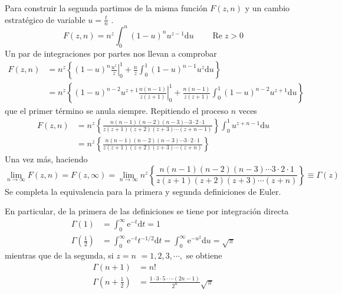 \documentclass[spanish,notitlepage,letterpaper,12pt]{article}
\begin{document}
Para construir la segunda partimos de la misma funci\'{o}n $F(z,n)$ y un
cambio estrat\'{e}gico de variable $u=\frac tn$ .
\[
F(z,n)=n^{z}\int_{0}^{n}\left(  1-u\right)  ^{n}u^{z-1}\mathrm{d}%
u\qquad\operatorname{Re}z>0
\]
Un par de integraciones por partes nos llevan a comprobar
\begin{align*}
F(z,n)  & =n^{z}\left\{  \left.  \left(  1-u\right)  ^{n}\frac{u^{z}}z\right|
_{0}^{1}+\frac nz\int_{0}^{1}\left(  1-u\right)  ^{n-1}u^{z}\mathrm{d}%
u\right\} \\
& =n^{z}\left\{  \left.  \left(  1-u\right)  ^{n-2}u^{z+1}\frac{n(n-1)}%
{z(z+1)}\right|  _{0}^{1}+\frac{n(n-1)}{z(z+1)}\int_{0}^{1}\left(  1-u\right)
^{n-2}u^{z+1}\mathrm{d}u\right\}
\end{align*}
que el primer t\'{e}rmino se anula siempre. Repitiendo el proceso $n$ veces
\begin{align*}
F(z,n)  & =n^{z}\left\{  \frac{n(n-1)(n-2)(n-3)\cdots3\cdot2\cdot
1}{z(z+1)(z+2)(z+3)\cdots(z+n-1)}\right\}  \int_{0}^{1}u^{z+n-1}\mathrm{d}u\\
& =n^{z}\left\{  \frac{n(n-1)(n-2)(n-3)\cdots3\cdot2\cdot1}%
{z(z+1)(z+2)(z+3)\cdots(z+n)}\right\}
\end{align*}
Una vez m\'{a}s, haciendo
\[
\lim_{n\rightarrow\infty}F(z,n)=F(z,\infty)=\lim_{n\rightarrow\infty}%
n^{z}\left\{  \frac{n(n-1)(n-2)(n-3)\cdots3\cdot2\cdot1}%
{z(z+1)(z+2)(z+3)\cdots(z+n)}\right\}  \equiv\Gamma\left(  z\right)
\]
Se completa la equivalencia para la primera y segunda definiciones de Euler.

En particular, de la primera de las definiciones se tiene por integraci\'{o}n
directa
\begin{align*}
\Gamma\left(  1\right)   & =\int_{0}^{\infty}\mathrm{e}^{-t}\mathrm{d}t=1\\
\Gamma\left(  \frac12\right)   & =\int_{0}^{\infty}\mathrm{e}^{-t}%
t^{-1/2}\mathrm{d}t=\int_{0}^{\infty}\mathrm{e}^{-u^{2}}\mathrm{d}u=\sqrt{\pi}%
\end{align*}
mientras que de la segunda, si $z=n$ $=1,2,3,\cdots,$ se obtiene
\begin{align*}
\Gamma\left(  n+1\right)   & =n!\\
\Gamma\left(  n+\frac12\right)   & =\frac{1\cdot3\cdot5\cdot\cdots
(2n-1)}{2^{n}}\sqrt{\pi}%
\end{align*}
\end{document}
